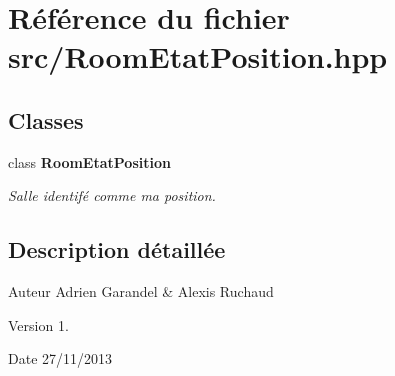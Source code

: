\section{Référence du fichier src/\-Room\-Etat\-Position.hpp}
\label{_room_etat_position_8hpp}
\subsection*{Classes}
\begin{DoxyCompactItemize}
\item 
class {\bf Room\-Etat\-Position}
\begin{DoxyCompactList}\small\item\em Salle identifé comme ma position. \end{DoxyCompactList}\end{DoxyCompactItemize}


\subsection{Description détaillée}
\begin{DoxyAuthor}{Auteur}
Adrien Garandel \& Alexis Ruchaud 
\end{DoxyAuthor}
\begin{DoxyVersion}{Version}
1. 
\end{DoxyVersion}
\begin{DoxyDate}{Date}
27/11/2013 
\end{DoxyDate}
